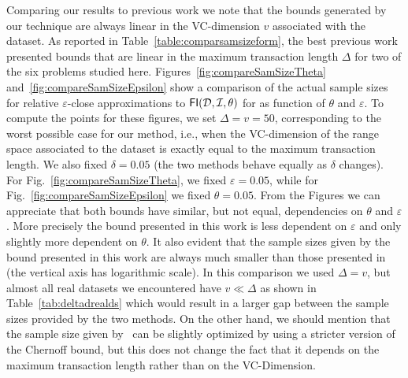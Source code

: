 Comparing our results to previous work we note that the bounds generated by our
technique are always linear in the VC-dimension $v$ associated with the dataset.
As reported in Table~\ref{table:comparsamsizeform}, the best previous
work~\citep{ChakaravarthyPS09} presented bounds that are linear in the maximum
transaction length $\Delta$ for two of the six problems studied here.
Figures~\ref{fig:compareSamSizeTheta} and~\ref{fig:compareSamSizeEpsilon} show
a comparison of the actual sample sizes for relative $\varepsilon$-close
approximations to $\mathsf{FI}({\cal D},{\cal I},\theta)$ for as function of $\theta$ and
$\varepsilon$. To compute the points for these figures, we set $\Delta=v=50$,
corresponding to the worst possible case for our method, i.e., when the
VC-dimension of the range space associated to the dataset is exactly equal to
the maximum transaction length. We also fixed $\delta=0.05$ (the two methods
behave equally as $\delta$ changes). For Fig.~\ref{fig:compareSamSizeTheta}, we
fixed $\varepsilon=0.05$, while for Fig.~\ref{fig:compareSamSizeEpsilon} we
fixed $\theta=0.05$. From the Figures we can appreciate that both bounds have
similar, but not equal, dependencies on $\theta$ and $\varepsilon$. More
precisely the bound presented in this work is less dependent on $\varepsilon$
and only slightly more dependent on $\theta$. It also evident that the sample
sizes given by the bound presented in this work are always much smaller than
those presented in~\citep{ChakaravarthyPS09} (the vertical axis has logarithmic
scale). In this comparison we used $\Delta=v$, but almost all real datasets
we encountered have $v\ll\Delta$ as shown in Table~\ref{tab:deltadrealds} which
would result in a larger gap between the sample sizes provided by the two
methods. On the other hand, we should mention that the sample size given
by~\citep{ChakaravarthyPS09} can be slightly optimized by using a stricter
version of the Chernoff bound, but this does not change the fact that it
depends on the maximum transaction length rather than on the VC-Dimension.

